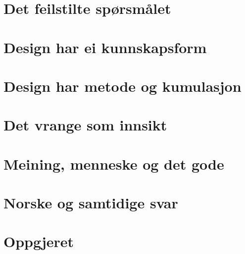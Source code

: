 \documentclass[11pt,twoside,openright]{book}
\begin{document}
\mainmatter
\pagestyle{fancy}



\part{Det feilstilte spørsmålet}



\part{Design har ei kunnskapsform}




\part{Design har metode og kumulasjon}




\part{Det vrange som innsikt}



\part{Meining, menneske og det gode}




\part{Norske og samtidige svar}



\part{Oppgjeret}



\backmatter
\pagestyle{plain}
\printbibliography[heading=bibintoc,title={Litteratur}]
\end{document}
